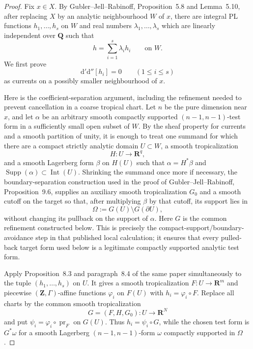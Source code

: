 \begin{proof}
Fix $x\in X$.  By Gubler--Jell--Rabinoff, Proposition~5.8 and
Lemma~5.10, after replacing $X$ by an analytic neighbourhood $W$ of $x$,
there are integral PL functions $h_1,\ldots,h_s$ on $W$ and real numbers
$\lambda_1,\ldots,\lambda_s$ which are linearly independent over
$\mathbf Q$ such that
\begin{equation}
\label{eq:p06-independent-decomposition}
                         h=\sum_{i=1}^{s}\lambda_i h_i
                         \qquad\text{on }W.
\end{equation}
We first prove
\begin{equation}
\label{eq:p06-integral-current-vanishing}
                         \mathrm d'\mathrm d''[h_i]=0
                         \qquad(1\leq i\leq s)
\end{equation}
as currents on a possibly smaller neighbourhood of $x$.

Here is the coefficient-separation argument, including the refinement
needed to prevent cancellation in a coarse tropical chart.  Let $n$ be the
pure dimension near $x$, and let $\alpha$ be an arbitrary smooth compactly
supported $(n-1,n-1)$-test form in a sufficiently small open subset of
$W$.  By the sheaf property for currents and a smooth partition of unity,
it is enough to treat one summand for which there are a compact strictly
analytic domain $U\subset W$, a smooth tropicalization
\[
                         H:U\longrightarrow\mathbf R^q,
\]
and a smooth Lagerberg form $\beta$ on $H(U)$ such that
$\alpha=H^*\beta$ and $\operatorname{Supp}(\alpha)\subset\operatorname{Int}(U)$.
Shrinking the summand once more if necessary, the boundary-separation
construction used in the proof of Gubler--Jell--Rabinoff,
Proposition~9.6, supplies an auxiliary smooth tropicalization $G_0$ and a
smooth cutoff on the target so that, after multiplying $\beta$ by that
cutoff, its support lies in
\[
       \Omega:=G(U)\setminus G(\partial U),
\]
without changing its pullback on the support of $\alpha$.  Here $G$ is the
common refinement constructed below.  This is precisely the
compact-support/boundary-avoidance step in that published local
calculation; it ensures that every pulled-back target form used below is a
legitimate compactly supported analytic test form.

Apply Proposition~8.3 and paragraph~8.4 of the same paper simultaneously
to the tuple $(h_1,\ldots,h_s)$ on $U$.  It gives a smooth tropicalization
$F:U\to\mathbf R^m$ and piecewise $(\mathbf Z,\Gamma)$-affine functions
$\varphi_i$ on $F(U)$ with $h_i=\varphi_i\circ F$.  Replace all charts by
the common smooth tropicalization
\[
               G=(F,H,G_0):U\longrightarrow\mathbf R^N
\]
and put $\psi_i=\varphi_i\circ\operatorname{pr}_F$ on $G(U)$.  Thus
$h_i=\psi_i\circ G$, while the chosen test form is $G^*\omega$ for a smooth
Lagerberg $(n-1,n-1)$-form $\omega$ compactly supported in $\Omega$.


\end{proof}
